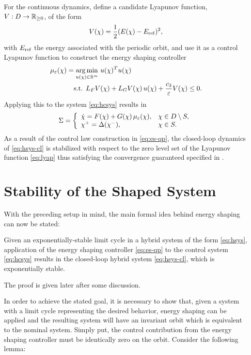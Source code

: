 For the continuous dynamics, define a candidate Lyapunov function, $V : D \to \mathbb{R}_{\geq 0}$, of the form
%
\begin{align}
  \label{eq:lyap}
  V(\chi) = \frac{1}{2} (E(\chi) - E_{\mathrm{ref}})^2,
\end{align}
%
with $E_{\mathrm{ref}}$ the energy associated with the periodic orbit, and use it as a control Lyapunov function to construct the energy shaping controller
%
\begin{align}
  \label{eq:es-qp}
  \mu_{\varepsilon}(\chi) = \operatorname*{arg\,min}_{u(\chi) \in \mathbb{R}^{m}} \ & u(\chi)^T u(\chi)\\
  \nonumber
  \mbox{s.t. } L_{F} V&(\chi) + L_{G} V(\chi) \, u(\chi) + \frac{c_{3}}{\varepsilon} V(\chi) \leq 0.
\end{align}
%
Applying this to the system \eqref{eq:hcsys} results in
%
\begin{align}
  \label{eq:hsys-cl}
  \Sigma = \left\{
  \begin{array}{l l}
    {\dot {\chi}} = F(\chi) + G(\chi) \, \mu_{\varepsilon}(\chi), & \chi \in D \setminus S,\\
    \chi^{+} = \Delta(\chi^{-}), &\chi \in S.
  \end{array}\right.
\end{align}
%
As a result of the control law construction in \eqref{eq:es-qp}, the closed-loop dynamics of \eqref{eq:hsys-cl} is stabilized with respect to the zero level set of the Lyapunov function \eqref{eq:lyap} thus satisfying the convergence guaranteed specified in .

\section{Stability of the Shaped System} \label{sec:stab}

With the preceding setup in mind, the main formal idea behind energy shaping can now be stated:\vgap
%
\begin{theorem}
  \label{theorem:main-theorem}
  Given an exponentially-stable limit cycle in a hybrid system of the form \eqref{eq:hsys}, application of the energy shaping controller \eqref{eq:es-qp} to the control system \eqref{eq:hcsys} results in the closed-loop hybrid system \eqref{eq:hsys-cl}, which is exponentially stable.\vgap
\end{theorem}
%

The proof is given later after some discussion.


In order to achieve the stated goal, it is necessary to show that, given a system with a limit cycle representing the desired behavior, energy shaping can be applied and the resulting system will have an invariant orbit which is equivalent to the nominal system. Simply put, the control contribution from the energy shaping controller must be identically zero on the orbit. Consider the following lemma:\vgap

